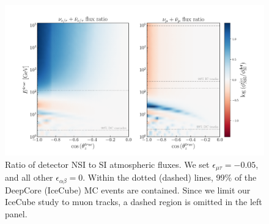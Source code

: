 \documentclass[draft=True]{revtex4-2}
\newcommand{\emt}{\ensuremath{\epsilon_{\mu\tau}}}
\begin{document}
\begin{figure}[!tb]\label{fig:flux_ratio}
   \begin{center}
      \includegraphics[width=0.8\linewidth]{figures/flux_ratio.pdf}
   \end{center}
   \caption{Ratio of detector NSI to SI atmospheric fluxes. We set $\emt = -0.05$, and all other $\epsilon_{\alpha\beta}=0$. 
   Within the dotted (dashed) lines, 99\% of the  DeepCore (IceCube) MC events are contained. Since we limit our IceCube study to muon tracks,
   a dashed region is omitted in the left panel.}
\end{figure}%
\end{document}
